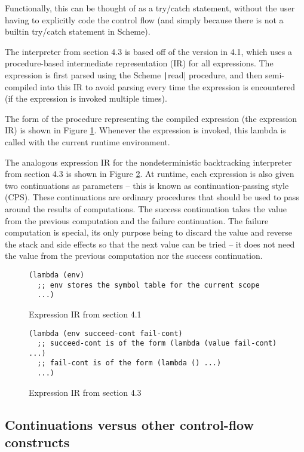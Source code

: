\documentclass[]{article}
\begin{document}
Functionally, this can be thought of as a try/catch statement, without the user having to explicitly code the control flow (and simply because there is not a builtin try/catch statement in Scheme).

The interpreter from section 4.3 is based off of the version in 4.1, which uses a procedure-based intermediate representation (IR) for all expressions. The expression is first parsed using the Scheme \texttt|read| procedure, and then semi-compiled into this IR to avoid parsing every time the expression is encountered (if the expression is invoked multiple times).

The form of the procedure representing the compiled expression (the expression IR) is shown in Figure \ref{fig:ir41}. Whenever the expression is invoked, this lambda is called with the current runtime environment.

The analogous expression IR for the nondeterministic backtracking interpreter from section 4.3 is shown in Figure \ref{fig:ir43}. At runtime, each expression is also given two continuations as parameters -- this is known as continuation-passing style (CPS). These continuations are ordinary procedures that should be used to pass around the results of computations. The success continuation takes the value from the previous computation and the failure continuation. The failure computation is special, its only purpose being to discard the value and reverse the stack and side effects so that the next value can be tried -- it does not need the value from the previous computation nor the success continuation.

\begin{figure}[h]
  \centering
\begin{verbatim}
(lambda (env)
  ;; env stores the symbol table for the current scope
  ...)
\end{verbatim}
  \caption{Expression IR from section 4.1}
  \label{fig:ir41}
\end{figure}

\begin{figure}[h]
  \centering
\begin{verbatim}
(lambda (env succeed-cont fail-cont)
  ;; succeed-cont is of the form (lambda (value fail-cont) ...)
  ;; fail-cont is of the form (lambda () ...)
  ...)
\end{verbatim}
  \caption{Expression IR from section 4.3}
  \label{fig:ir43}
\end{figure}

\subsection{Continuations versus other control-flow constructs}
\label{sec:cntf}
\end{document}
